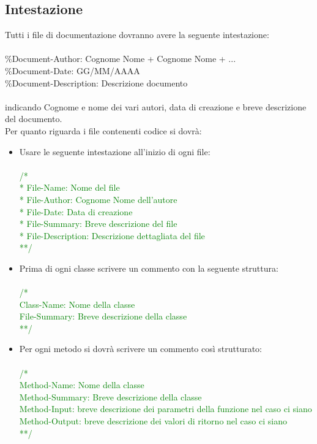 \documentclass[../NormeDiProgetto.tex]{subfiles}
\begin{document}
		\subsection{Intestazione}
		Tutti i file di documentazione dovranno avere la seguente intestazione:\\
		\\
		\%Document-Author: Cognome Nome + Cognome Nome + ...\\
		\%Document-Date: GG/MM/AAAA\\
		\%Document-Description: Descrizione documento
		\\
		\\
		indicando Cognome e nome dei vari autori, data di creazione e breve descrizione del documento.\\
		Per quanto riguarda i file contenenti codice si dovrà:
		\begin{itemize}
			\item Usare le seguente intestazione all'inizio di ogni file:\\
			\textcolor{green}{	\\/*\\
				* File-Name: Nome del file\\
				* File-Author: Cognome Nome dell’autore\\
				* File-Date: Data di creazione\\
				* File-Summary: Breve descrizione del file\\
				* File-Description: Descrizione dettagliata del file\\
				**/}
			\item Prima di ogni classe scrivere un commento con la seguente struttura:\\
			\textcolor{green}{	\\/*\\
				Class-Name: Nome della classe\\
				File-Summary: Breve descrizione della classe\\
				**/}
			\item Per ogni metodo si dovrà scrivere un commento così strutturato:\\
			\textcolor{green}{	\\/*\\
				Method-Name: Nome della classe\\
				Method-Summary: Breve descrizione della classe\\
				Method-Input: breve descrizione dei parametri della funzione nel caso ci siano\\
				Method-Output: breve descrizione dei valori di ritorno nel caso ci siano\\ 
				**/ }
		\end{itemize}
\end{document}
